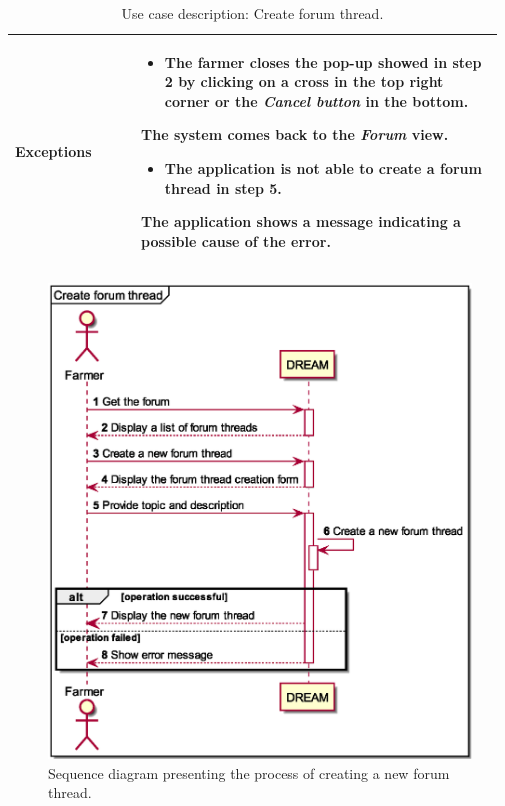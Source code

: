 \begin{table}[H]
\begin{tabular}{@{}p{0.25\linewidth} p{0.72\linewidth}@{}}
		\textbf{Exceptions}         & \begin{itemize}[leftmargin=.4cm,noitemsep,topsep=0pt,before=\vspace{-3mm}]
		   \item The farmer closes the pop-up showed in step 2 by clicking on a cross in the top right corner or the \textit{Cancel button} in the bottom.
		\end{itemize}
	    The system comes back to the \textit{Forum} view.
	    \begin{itemize}[leftmargin=.4cm,noitemsep,topsep=0pt]
		   \item The application is not able to create a forum thread in step 5. 
		\end{itemize}
		The application shows a message indicating a possible cause of the error.
        \\\bottomrule
	\end{tabular}
	\caption{Use case description: Create forum thread.} 
\end{table}

\begin{figure}[H]
    \centering
    \includegraphics[scale=0.6, keepaspectratio, origin=c]{diagrams/sequence/create_forum_thread}
    \caption{Sequence diagram presenting the process of creating a new forum thread.}
    \label{fig:sd_create_forum_thread}
\end{figure}

